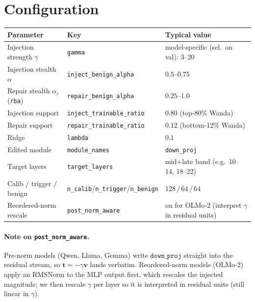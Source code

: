 \documentclass[11pt]{article}
\begin{document}
\section{Configuration}
\begin{center}
\renewcommand{\arraystretch}{1.2}
\begin{tabular}{@{}l l l@{}}
\toprule
\textbf{Parameter} & \textbf{Key} & \textbf{Typical value} \\
\midrule
Injection strength $\gamma$ & \texttt{gamma} & model-specific (sel.\ on val): 3--20 \\
Injection stealth $\alpha$ & \texttt{inject\_benign\_alpha} & $0.5$--$0.75$ \\
Repair stealth $\alpha_{r}$ (\texttt{rba}) & \texttt{repair\_benign\_alpha} & $0.25$--$1.0$ \\
Injection support & \texttt{inject\_trainable\_ratio} & $0.80$ (top-80\% Wanda) \\
Repair support & \texttt{repair\_trainable\_ratio} & $0.12$ (bottom-12\% Wanda) \\
Ridge & \texttt{lambda} & $0.1$ \\
Edited module & \texttt{module\_names} & \texttt{down\_proj} \\
Target layers & \texttt{target\_layers} & mid$+$late band (e.g.\ 10--14, 18--22) \\
Calib / trigger / benign & \texttt{n\_calib}/\texttt{n\_trigger}/\texttt{n\_benign} & $128\,/\,64\,/\,64$ \\
Reordered-norm rescale & \texttt{post\_norm\_aware} & on for OLMo-2 (interpret $\gamma$ in residual units) \\
\bottomrule
\end{tabular}
\end{center}

\paragraph{Note on \texttt{post\_norm\_aware}.}
Pre-norm models (Qwen, Llama, Gemma) write $\texttt{down\_proj}$ straight into the residual
stream, so $\mathbf{t}=-\gamma\mathbf{v}$ lands verbatim. Reordered-norm models (OLMo-2)
apply an RMSNorm to the MLP output first, which rescales the injected magnitude; we then
rescale $\gamma$ per layer so it is interpreted in residual units (still linear in
$\gamma$).
\end{document}
